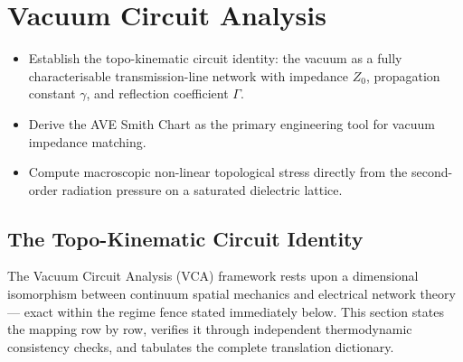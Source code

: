 \chapter{Vacuum Circuit Analysis}


\begin{objectivebox}
\begin{itemize}
    \item Establish the topo-kinematic circuit identity: the vacuum as a fully characterisable transmission-line network with impedance $Z_0$, propagation constant $\gamma$, and reflection coefficient $\Gamma$.
    \item Derive the AVE Smith Chart as the primary engineering tool for vacuum impedance matching.
    \item Compute macroscopic non-linear topological stress directly from the second-order radiation pressure on a saturated dielectric lattice.
\end{itemize}
\end{objectivebox}

\section{The Topo-Kinematic Circuit Identity}
\label{sec:topo_kinematic}

The Vacuum Circuit Analysis (VCA) framework rests upon a dimensional isomorphism between continuum spatial mechanics and electrical network theory --- exact within the regime fence stated immediately below. This section states the mapping row by row, verifies it through independent thermodynamic consistency checks, and tabulates the complete translation dictionary.

